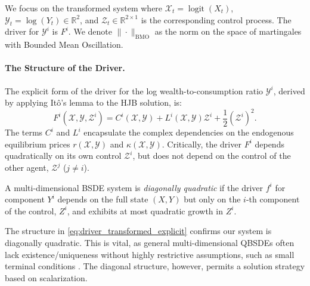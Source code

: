 \begin{tcolorbox}[colback=blue!5!white, colframe=blue!75!black, title={Notation for Transformed System}]
We focus on the transformed system where $\mathcal{X}_t = \operatorname{logit}(X_t)$, $\mathcal{Y}_t = \log(Y_t) \in \mathbb{R}^2$, and $\mathcal{Z}_t \in \mathbb{R}^{2\times 1}$ is the corresponding control process. The driver for $\mathcal{Y}^i$ is $F^i$. We denote $\|\cdot\|_{\mathrm{BMO}}$ as the norm on the space of martingales with Bounded Mean Oscillation.
\end{tcolorbox}

\paragraph{The Structure of the Driver.}
The explicit form of the driver for the log wealth-to-consumption ratio $\mathcal{Y}^i$, derived by applying Itô's lemma to the HJB solution, is:
\begin{equation}\label{eq:driver_transformed_explicit}
    F^i(\mathcal{X}, \mathcal{Y}, \mathcal{Z}^i) = C^i(\mathcal{X}, \mathcal{Y}) + L^i(\mathcal{X}, \mathcal{Y}) \mathcal{Z}^i + \frac{1}{2} (\mathcal{Z}^i)^2.
\end{equation}
The terms $C^i$ and $L^i$ encapsulate the complex dependencies on the endogenous equilibrium prices $r(\mathcal{X}, \mathcal{Y})$ and $\kappa(\mathcal{X}, \mathcal{Y})$. Critically, the driver $F^i$ depends quadratically on its own control $\mathcal{Z}^i$, but does not depend on the control of the other agent, $\mathcal{Z}^j$ ($j \neq i$).

\begin{definition}
A multi-dimensional BSDE system is \emph{diagonally quadratic} if the driver $f^i$ for component $Y^i$ depends on the full state $(X, Y)$ but only on the $i$-th component of the control, $Z^i$, and exhibits at most quadratic growth in $Z^i$.
\end{definition}

The structure in \eqref{eq:driver_transformed_explicit} confirms our system is diagonally quadratic. This is vital, as general multi-dimensional QBSDEs often lack existence/uniqueness without highly restrictive assumptions, such as small terminal conditions \cite{Tevzadze2008}. The diagonal structure, however, permits a solution strategy based on scalarization.

